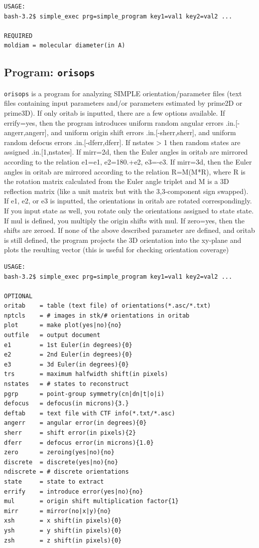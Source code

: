 \documentclass[a4paper,11pt]{article}
\newcommand{\prgname}[1]{\textcolor{NavyBlue}{\texttt{#1}}}
\begin{document}
\begin{verbatim}
USAGE:
bash-3.2$ simple_exec prg=simple_program key1=val1 key2=val2 ...

REQUIRED
moldiam = molecular diameter(in A)
\end{verbatim}

\subsection{Program: \prgname{orisops}}
\label{orisops}
\prgname{orisops} is a program for analyzing SIMPLE orientation/parameter files (text files containing input parameters and/or parameters estimated by prime2D or prime3D). If only oritab is inputted, there are a few options available. If errify=yes, then the program introduces uniform random angular errors .in.[-angerr,angerr], and uniform origin shift errors .in.[-sherr,sherr], and uniform random defocus errors .in.[-dferr,dferr]. If nstates > 1 then random states are assigned .in.[1,nstates]. If mirr=2d, then the Euler angles in oritab are mirrored according to the relation e1=e1, e2=180.+e2, e3=-e3. If mirr=3d, then the Euler angles in oritab are mirrored according to the relation R=M(M*R), where R is the rotation matrix calculated from the Euler angle triplet and M is a 3D reflection matrix (like a unit matrix but with the 3,3-component sign swapped). If e1, e2, or e3 is inputted, the orientations in oritab are rotated correspondingly. If you input state as well, you rotate only the orientations assigned to state state. If mul is defined, you multiply the origin shifts with mul. If zero=yes, then the shifts are zeroed. If none of the above described parameter are defined, and oritab is still defined, the program projects the 3D orientation into the xy-plane and plots the resulting vector (this is useful for checking orientation coverage)

\begin{verbatim}
USAGE:
bash-3.2$ simple_exec prg=simple_program key1=val1 key2=val2 ...

OPTIONAL
oritab    = table (text file) of orientations(*.asc/*.txt)
nptcls    = # images in stk/# orientations in oritab
plot      = make plot(yes|no){no}
outfile   = output document
e1        = 1st Euler(in degrees){0}
e2        = 2nd Euler(in degrees){0}
e3        = 3d Euler(in degrees){0}
trs       = maximum halfwidth shift(in pixels)
nstates   = # states to reconstruct
pgrp      = point-group symmetry(cn|dn|t|o|i)
defocus   = defocus(in microns){3.}
deftab    = text file with CTF info(*.txt/*.asc)
angerr    = angular error(in degrees){0}
sherr     = shift error(in pixels){2}
dferr     = defocus error(in microns){1.0}
zero      = zeroing(yes|no){no}
discrete  = discrete(yes|no){no}
ndiscrete = # discrete orientations
state     = state to extract
errify    = introduce error(yes|no){no}
mul       = origin shift multiplication factor{1}
mirr      = mirror(no|x|y){no}
xsh       = x shift(in pixels){0}
ysh       = y shift(in pixels){0}
zsh       = z shift(in pixels){0}
\end{verbatim}
\end{document}
